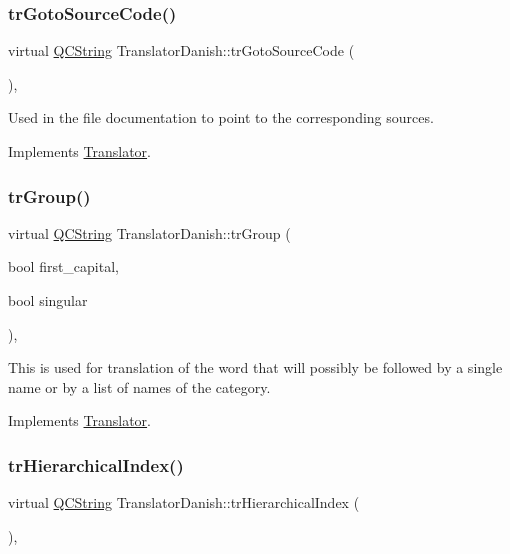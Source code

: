 \subsubsection{\texorpdfstring{trGotoSourceCode()}{trGotoSourceCode()}}
{\footnotesize\ttfamily virtual \mbox{\hyperlink{class_q_c_string}{Q\+C\+String}} Translator\+Danish\+::tr\+Goto\+Source\+Code (\begin{DoxyParamCaption}{ }\end{DoxyParamCaption})\hspace{0.3cm}{\ttfamily [inline]}, {\ttfamily [virtual]}}

Used in the file documentation to point to the corresponding sources. 

Implements \mbox{\hyperlink{class_translator}{Translator}}.

\mbox{\label{class_translator_danish_ad7719d9271d6e6d9defb78f4c741070f}} 
\subsubsection{\texorpdfstring{trGroup()}{trGroup()}}
{\footnotesize\ttfamily virtual \mbox{\hyperlink{class_q_c_string}{Q\+C\+String}} Translator\+Danish\+::tr\+Group (\begin{DoxyParamCaption}\item[{bool}]{first\+\_\+capital,  }\item[{bool}]{singular }\end{DoxyParamCaption})\hspace{0.3cm}{\ttfamily [inline]}, {\ttfamily [virtual]}}

This is used for translation of the word that will possibly be followed by a single name or by a list of names of the category. 

Implements \mbox{\hyperlink{class_translator}{Translator}}.

\mbox{\label{class_translator_danish_ac778eb5f4405565f817a431f1c061529}} 
\subsubsection{\texorpdfstring{trHierarchicalIndex()}{trHierarchicalIndex()}}
{\footnotesize\ttfamily virtual \mbox{\hyperlink{class_q_c_string}{Q\+C\+String}} Translator\+Danish\+::tr\+Hierarchical\+Index (\begin{DoxyParamCaption}{ }\end{DoxyParamCaption})\hspace{0.3cm}{\ttfamily [inline]}, {\ttfamily [virtual]}}

